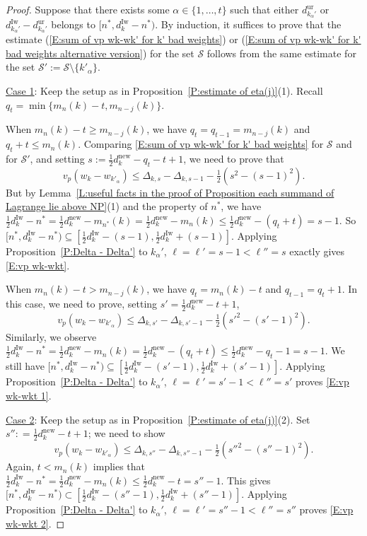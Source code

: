 \documentclass[12pt]{amsart}
\theoremstyle{definition}
\numberwithin{equation}{subsection}
\def\calS{\mathcal{S}}
\newcommand{\new}{\mathrm{new}}
\newcommand{\Iw}{\mathrm{Iw}}
\newcommand{\ur}{\mathrm{ur}}
\begin{document}
\begin{proof}
Suppose that there exists some $\alpha\in \{1,\dots, t\}$ such that either $d_{k_\alpha'}^\ur$ or $d_{k_\alpha'}^\Iw-d_{k_\alpha'}^\ur$ belongs to $[n^\ast,d_k^\Iw-n^\ast)$. By induction, it suffices to prove that the estimate (\ref{E:sum of vp wk-wk' for k' bad weights}) or (\ref{E:sum of vp wk-wk' for k' bad weights alternative version}) for the set $\calS$ follows from the same estimate for the set $\calS':=\calS\setminus \{k'_\alpha \}$.

\smallskip
\underline{Case 1}: Keep the setup as in Proposition~\ref{P:estimate of eta(j)}(1). Recall $q_t = \min\{m_n(k)-t, m_{n-j}(k)\}$.
		
When $m_n(k)-t\geq m_{n-j}(k)$, we have $q_t=q_{t-1}=m_{n-j}(k)$ and $q_t+t\leq m_n(k)$. Comparing \eqref{E:sum of vp wk-wk' for k' bad weights} for $\calS$ and for $\calS'$, and setting $s:= \frac 12 d_k^\new - q_t-t+1$, we need to prove that
\begin{equation}
    \label{E:vp wk-wkt}
v_p(w_k-w_{k'_\alpha}) \leq \Delta_{k, s} - \Delta_{k, s-1} -\tfrac 12 (s^2-(s-1)^2).
\end{equation}
But by Lemma~\ref{L:useful facts in the proof of Proposition each summand of Lagrange lie above NP}(1) and the property of $n^*$, we have $\frac 12 d_k^\Iw-n^*=\frac 12 d_k^\new-m_{n^*}(k)=\frac 12 d_k^\new-m_n(k)\leq \frac 12 d_k^\new -(q_t+t) = s-1$. So $[n^\ast,d_k^\Iw-n^\ast)\subseteq [\frac 12d_k^\Iw-(s-1),\frac 12d_k^\Iw+(s-1)]$. Applying Proposition~\ref{P:Delta - Delta'} to $k_\alpha'$, $\ell=\ell'=s-1<\ell''=s$ exactly gives \eqref{E:vp wk-wkt}.
			
When $m_n(k)-t > m_{n-j}(k)$, we have $q_t=m_n(k)-t$ and $q_{t-1}=q_t+1$. In this case, we need to prove, setting $s' = \frac 12d_k^\new - t+1$,
\begin{equation}
\label{E:vp wk-wkt 1}
v_p(w_k-w_{k'_\alpha}) \leq \Delta_{k, s'} - \Delta_{k, s'-1}- \tfrac 12(s'^2-(s'-1)^2).
\end{equation}
Similarly, we observe $\frac 12 d_k^\Iw-n^*=\frac 12 d_k^\new-m_n(k)=\frac 12 d_k^\new-(q_t+t)\leq \frac 12 d_k^\new -q_t-1 = s-1$. We still have $[n^*, d_k^\Iw - n^*) \subseteq [\frac 12d_k^\Iw-(s'-1),\frac 12d_k^\Iw+(s'-1)]$.
Applying Proposition~\ref{P:Delta - Delta'} to $k_\alpha'$, $\ell=\ell'=s'-1<\ell''=s'$ proves \eqref{E:vp wk-wkt 1}.

\smallskip
\underline{Case 2}: Keep the setup as in Proposition~\ref{P:estimate of eta(j)}(2). Set $s'': = \frac 12 d_k^\new -t+1$; we need to show 
\begin{equation}
\label{E:vp wk-wkt 2}
v_p(w_k-w_{k'_\alpha}) \leq \Delta_{k, s''} - \Delta_{k, s''-1}- \tfrac 12(s''^2-(s''-1)^2).
\end{equation}
Again, $t<m_n(k)$ implies that $\frac 12 d_k^\Iw-n^\ast=\frac 12 d_k^\new-m_n(k)\leq \frac 12 d_k^\new-t = s''-1$. This gives $[n^*, d_k^\Iw-n^*)\subset [\frac 12 d_k^\Iw-(s''-1), \frac 12 d_k^\Iw+(s''-1)]$. Applying Proposition~\ref{P:Delta - Delta'} to $k_\alpha'$, $\ell=\ell'=s''-1<\ell''=s''$ proves \eqref{E:vp wk-wkt 2}.  
\end{proof}
\end{document}
